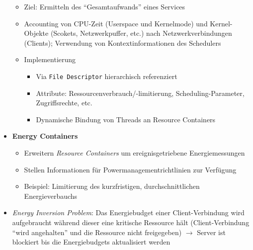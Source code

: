\begin{itemize}
	\begin{itemize}
		\item Ziel: Ermitteln des "`Gesamtaufwands"' eines Services
		\item Accounting von CPU-Zeit (Userspace und Kernelmode) und Kernel-Objekte (Scokets, Netzwerkpuffer, etc.) nach Netzwerkverbindungen (Clients); Verwendung von Kontextinformationen des Schedulers
		\item Implementierung
		\begin{itemize}
			\item Via \texttt{File Descriptor} hierarchisch referenziert
			\item Attribute: Ressourcenverbrauch/-limitierung, Scheduling-Parameter, Zugriffsrechte, etc.
			\item Dynamische Bindung von Threads an Resource Containers
		\end{itemize}
	\end{itemize}
	\item \textbf{Energy Containers}
	\begin{itemize}
		\item Erweitern \textit{Resource Containers} um ereignisgetriebene Energiemessungen
		\item Stellen Informationen für Powermanagementrichtlinien zur Verfügung
		\item Beispiel: Limitierung des kurzfristigen, durchschnittlichen Energieverbauchs
	\end{itemize}
	\item \textit{Energy Inversion Problem}: Das Energiebudget einer Client-Verbindung wird aufgebraucht während dieser eine kritische Ressource hält (Client-Verbindung "`wird angehalten"' und die Ressource nicht freigegeben) \(\rightarrow\) Server ist blockiert bis die Energiebudgets aktualisiert werden
\end{itemize}


